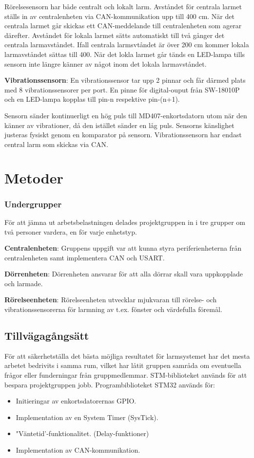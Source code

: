 \documentclass{article}
\begin{document}
Rörelsesensorn har både centralt och lokalt larm. Avståndet för centrala larmet ställs in av centralenheten via CAN-kommunikation 
upp till 400 cm. När det centrala larmet går skickas ett CAN-meddelande till centralenheten som agerar därefter. 
Avståndet för lokala larmet sätts automatiskt till två gånger det centrala larmavståndet. Ifall centrala larmsvtåndet är över 200 cm kommer 
lokala larmavståndet sättas till 400. När det lokla larmet går tänds en LED-lampa tills sensorn inte längre känner av något inom 
det lokala larmavståndet.

\textbf{Vibrationssensorn}:
En vibrationssensor tar upp 2 pinnar och får därmed plats med 8 vibrationssensorer per port. 
En pinne för digital-ouput från SW-18010P och en LED-lampa kopplas till pin-n respektive pin-(n+1).

Sensorn sänder kontinuerligt en hög puls till MD407-enkortsdatorn utom när den
känner av vibrationer, då den istället sänder en låg puls. Sensorns känslighet justeras fysiskt genom en komparator på sensorn. 
Vibrationssensorn har endast central larm som skickas via CAN.



\section{Metoder}

\subsubsection{Undergrupper}
För att jämna ut arbetsbelastningen delades projektgruppen in i tre grupper om två personer vardera,
en för varje enhetstyp.

\textbf{Centralenheten}: Gruppens uppgift var att kunna styra
periferienheterna från centralenheten samt implementera CAN och USART.

\textbf{Dörrenheten}: Dörrenheten ansvarar för att alla dörrar skall vara uppkopplade och larmade.

\textbf{Rörelseenheten}: Rörelseenheten utvecklar mjukvaran till
rörelse- och vibrationssensorerna för larmning av t.ex. fönster och värdefulla föremål.


\subsection{Tillvägagångsätt}
\label{tillvägagångsätt}
För att säkerhetställa det bästa möjliga resultatet för larmsystemet har det mesta arbetet bedrivits i samma
rum, vilket har låtit gruppen samråda om eventuella frågor eller funderningar från gruppmedlemmar.
STM-biblioteket används för att bespara projektgruppen jobb.
Programbiblioteket STM32\cite{stm} används för:
\begin{itemize}
    \item Initieringar av enkortsdatorernas GPIO.
    \item Implementation av en System Timer (SysTick).
    \item "Väntetid'-funktionalitet. (Delay-funktioner)
    \item Implementation av CAN-kommunikation.
\end{itemize}
\end{document}
